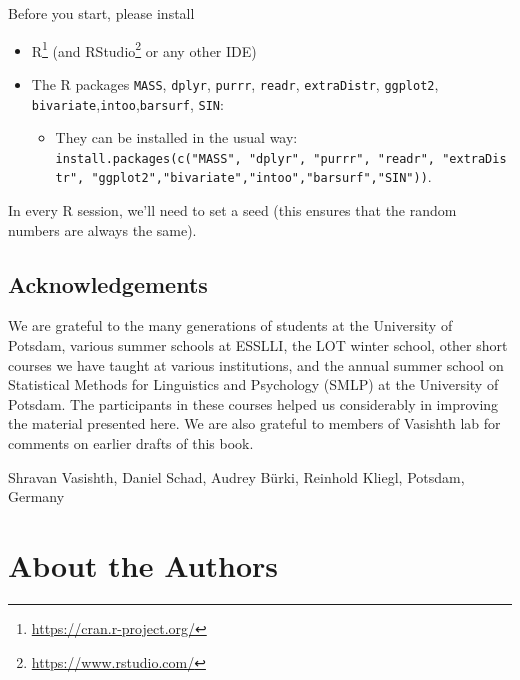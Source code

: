 \documentclass[12pt,]{krantz}
\providecommand{\tightlist}{%
  \setlength{\itemsep}{0pt}\setlength{\parskip}{0pt}}
\renewcommand{\href}[2]{#2\footnote{\url{#1}}}
\begin{document}
Before you start, please install

\begin{itemize}
\tightlist
\item
  \href{https://cran.r-project.org/}{R} (and \href{https://www.rstudio.com/}{RStudio} or any other IDE)
\item
  The R packages \texttt{MASS}, \texttt{dplyr}, \texttt{purrr}, \texttt{readr}, \texttt{extraDistr}, \texttt{ggplot2}, \texttt{bivariate},\texttt{intoo},\texttt{barsurf}, \texttt{SIN}:

  \begin{itemize}
  \tightlist
  \item
    They can be installed in the usual way: \texttt{install.packages(c("MASS",\ "dplyr",\ "purrr",\ "readr",\ "extraDistr",\ "ggplot2","bivariate","intoo","barsurf","SIN"))}.
  \end{itemize}
\end{itemize}

In every R session, we'll need to set a seed (this ensures that the random numbers are always the same).

\hypertarget{acknowledgements}{%
\section{Acknowledgements}\label{acknowledgements}}

We are grateful to the many generations of students at the University of Potsdam, various summer schools at ESSLLI, the LOT winter school, other short courses we have taught at various institutions, and the annual summer school on Statistical Methods for Linguistics and Psychology (SMLP) at the University of Potsdam. The participants in these courses helped us considerably in improving the material presented here. We are also grateful to members of Vasishth lab for comments on earlier drafts of this book.

\begin{flushright}
Shravan Vasishth,
Daniel Schad,
Audrey Bürki,
Reinhold Kliegl,
Potsdam, Germany
\end{flushright}

\hypertarget{about-the-authors}{%
\chapter*{About the Authors}\label{about-the-authors}}
\end{document}
